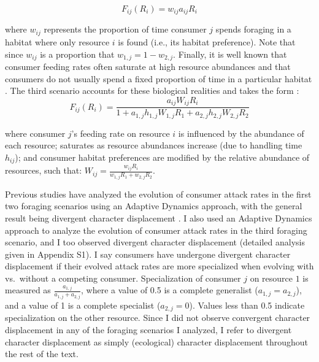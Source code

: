 \documentclass[11pt,]{article}
\begin{document}
\begin{equation} \label{eq:3}
  F_{ij}(R_i)=w_{ij}a_{ij}R_i
\end{equation}

where \(w_{ij}\) represents the proportion of time consumer \(j\) spends
foraging in a habitat where only resource \(i\) is found (i.e., its
habitat preference). Note that since \(w_{ij}\) is a proportion that
\(w_{1,j}=1-w_{2,j}\). Finally, it is well known that consumer feeding
rates often saturate at high resource abundances
\citep{Holling1959, Rosenzweig1963, Murdoch2003, McCann2011} and that
consumers do not usually spend a fixed proportion of time in a
particular habitat \citep{McCann2005}. The third scenario accounts for
these biological realities and takes the form \citep[derived
by][]{McCann2005}:\\

\begin{equation} \label{eq:4}
  F_{ij}(R_i)=\frac{a_{ij}W_{ij}R_i}{1+a_{1,j}h_{1,j}W_{1,j}R_1+a_{2,j}h_{2,j}W_{2,j}R_2}
\end{equation}

where consumer \(j\)'s feeding rate on resource \(i\) is influenced by
the abundance of each resource; saturates as resource abundances
increase (due to handling time \(h_{ij}\)); and consumer habitat
preferences are modified by the relative abundance of resources, such
that: \(W_{ij}=\frac{w_{ij}R_i}{w_{1,j}R_1+w_{2,j}R_2}\).

Previous studies have analyzed the evolution of consumer attack rates in
the first two foraging scenarios using an Adaptive Dynamics approach,
with the general result being divergent character displacement
\citep{Lawlor1976, Abrams1986}. I also used an Adaptive Dynamics
approach to analyze the evolution of consumer attack rates in the third
foraging scenario, and I too observed divergent character displacement
(detailed analysis given in Appendix S1). I say consumers have undergone
divergent character displacement if their evolved attack rates are more
specialized when evolving with vs.~without a competing consumer.
Specialization of consumer \(j\) on resource \(1\) is measured as
\(\frac{a_{1,j}}{a_{1,j}+a_{2,j}}\), where a value of 0.5 is a complete
generalist (\(a_{1,j}=a_{2,j}\)), and a value of 1 is a complete
specialist (\(a_{2,j}=0\)). Values less than 0.5 indicate specialization
on the other resource. Since I did not observe convergent character
displacement in any of the foraging scenarios I analyzed, I refer to
divergent character displacement as simply (ecological) character
displacement throughout the rest of the text.
\end{document}

